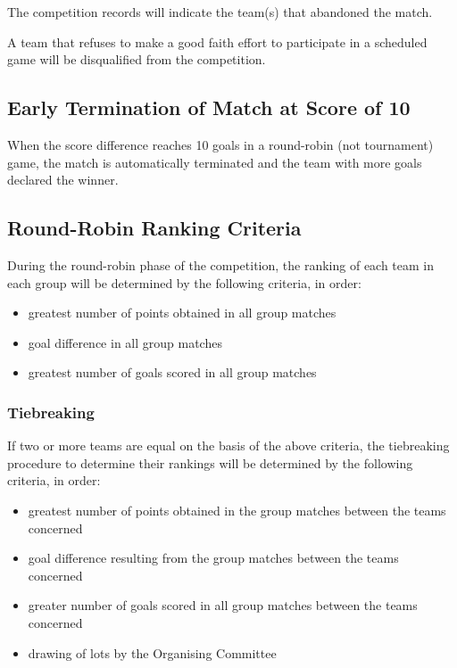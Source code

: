 The competition records will indicate the team(s) that abandoned the match.

A team that refuses to make a good faith effort to participate in a
scheduled game will be disqualified from the competition.

\subsection{Early Termination of Match at Score of 10}

When the score difference reaches 10 goals in a round-robin (not tournament) game, the match is automatically terminated and the team with more goals declared the winner.

\subsection{Round-Robin Ranking Criteria}

During the round-robin phase of the competition, the ranking of each team in each group will be determined by the following criteria, in order:
\begin{itemize}
\item greatest number of points obtained in all group matches
\item goal difference in all group matches
\item greatest number of goals scored in all group matches
\end{itemize}

\subsubsection{Tiebreaking}
If two or more teams are equal on the basis of the above criteria, the tiebreaking procedure to determine their rankings will be determined by the following criteria, in order:
\begin{itemize}
\item greatest number of points obtained in the group matches between the teams concerned
\item goal difference resulting from the group matches between the teams concerned
\item greater number of goals scored in all group matches between the teams concerned
\item drawing of lots by the Organising Committee
\end{itemize}
